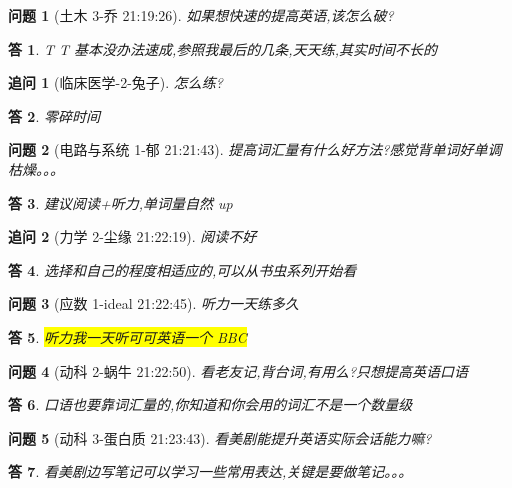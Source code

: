 \documentclass[utf8,a4paper]{ctexart}
\theoremstyle{nonumberplain}
\newtheorem{answer}{\color{blue}答}
\theoremstyle{nonumberplain}
\newtheorem{postquestion}{\color{magenta}追问}
\newtheorem{question}{\color{magenta}问题}
\newcommand\tips[1]{\colorbox{yellow}{#1}}
\begin{document}
\begin{question}[土木 3-乔 21:19:26]
  如果想快速的提高英语,该怎么破?
\end{question}

\begin{answer}
  T T 基本没办法速成,参照我最后的几条,天天练,其实时间不长的
\end{answer}

\begin{postquestion}[临床医学-2-兔子]
  怎么练?
\end{postquestion}

\begin{answer}
  零碎时间
\end{answer}

\begin{question}[电路与系统 1-郁 21:21:43]
  提高词汇量有什么好方法?感觉背单词好单调枯燥。。。
\end{question}
\begin{answer}
  建议阅读+听力,单词量自然 up
\end{answer}

\begin{postquestion}[力学 2-尘缘 21:22:19]
  阅读不好
\end{postquestion}

\begin{answer}
  选择和自己的程度相适应的,可以从书虫系列开始看
\end{answer}

\begin{question}[应数 1-ideal 21:22:45]
  听力一天练多久
\end{question}

\begin{answer}
  \tips{听力我一天听可可英语一个 BBC}
\end{answer}

\begin{question}[动科 2-蜗牛 21:22:50]
  看老友记,背台词,有用么?只想提高英语口语
\end{question}
\begin{answer}
  口语也要靠词汇量的,你知道和你会用的词汇不是一个数量级
\end{answer}

\begin{question}[动科 3-蛋白质 21:23:43]
  看美剧能提升英语实际会话能力嘛?
\end{question}

\begin{answer}
  看美剧边写笔记可以学习一些常用表达,关键是要做笔记。。。
\end{answer}
\end{document}
